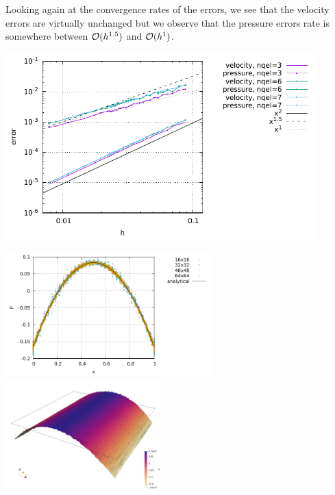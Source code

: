 Looking again at the convergence rates of the errors, we see that the velocity errors 
are virtually unchanged but we observe that the pressure errors rate is somewhere between 
${\cal O}(h^{1.5})$ and ${\cal O}(h^{1})$.

\begin{center}
\includegraphics[width=12cm]{python_codes/fieldstone_47/results/rand/errors}
\end{center}

\begin{center}
\includegraphics[width=8cm]{python_codes/fieldstone_47/results/rand/pressure.pdf}
\includegraphics[width=6cm]{python_codes/fieldstone_47/results/rand/press_64x64.png}
\end{center}
